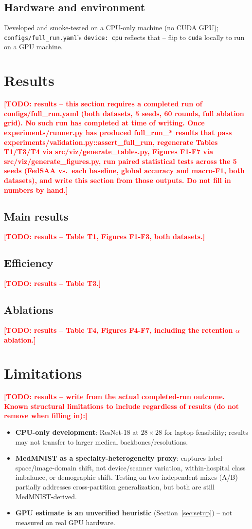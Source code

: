 \documentclass[11pt]{article}
\newcommand{\todoresults}[1]{\textcolor{red}{\textbf{[TODO: results -- #1]}}}
\begin{document}
\subsection{Hardware and environment}
Developed and smoke-tested on a CPU-only machine (no CUDA GPU); \texttt{configs/full\_run.yaml}'s
\texttt{device: cpu} reflects that -- flip to \texttt{cuda} locally to run on a GPU machine.

\section{Results}
\todoresults{this section requires a completed run of configs/full\_run.yaml (both datasets, 5
seeds, 60 rounds, full ablation grid). No such run has completed at time of writing. Once
experiments/runner.py has produced full\_run\_* results that pass
experiments/validation.py::assert\_full\_run, regenerate Tables T1/T3/T4 via
src/viz/generate\_tables.py, Figures F1-F7 via src/viz/generate\_figures.py, run paired
statistical tests across the 5 seeds (FedSAA vs.\ each baseline, global accuracy and macro-F1,
both datasets), and write this section from those outputs. Do not fill in numbers by hand.}

\subsection{Main results}
\todoresults{Table T1, Figures F1-F3, both datasets.}

\subsection{Efficiency}
\todoresults{Table T3.}

\subsection{Ablations}
\todoresults{Table T4, Figures F4-F7, including the retention $\alpha$ ablation.}

\section{Limitations}
\todoresults{write from the actual completed-run outcome. Known structural limitations to
include regardless of results (do not remove when filling in):}
\begin{itemize}
  \item \textbf{CPU-only development}: ResNet-18 at $28\times28$ for laptop feasibility; results
    may not transfer to larger medical backbones/resolutions.
  \item \textbf{MedMNIST as a specialty-heterogeneity proxy}: captures label-space/image-domain
    shift, not device/scanner variation, within-hospital class imbalance, or demographic shift.
    Testing on two independent mixes (A/B) partially addresses cross-partition generalization,
    but both are still MedMNIST-derived.
  \item \textbf{GPU estimate is an unverified heuristic} (Section~\ref{sec:setup}) -- not
    measured on real GPU hardware.
\end{itemize}
\end{document}
